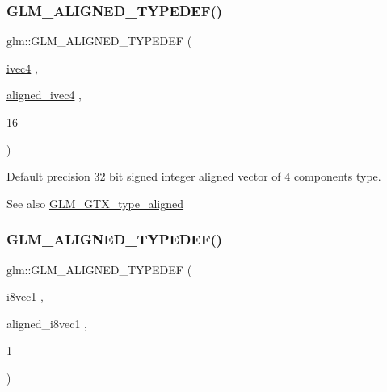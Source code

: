 \subsubsection{\texorpdfstring{G\+L\+M\+\_\+\+A\+L\+I\+G\+N\+E\+D\+\_\+\+T\+Y\+P\+E\+D\+E\+F()}{GLM\_ALIGNED\_TYPEDEF()}\hspace{0.1cm}{\footnotesize\ttfamily [52/209]}}
{\footnotesize\ttfamily glm\+::\+G\+L\+M\+\_\+\+A\+L\+I\+G\+N\+E\+D\+\_\+\+T\+Y\+P\+E\+D\+EF (\begin{DoxyParamCaption}\item[{\hyperlink{group__core__types_gaa4560ddc50320ea8f8a70d5c9c249fea}{ivec4}}]{,  }\item[{\hyperlink{group__gtc__type__aligned_gaa33169a30c7d22a8648f20b4534f635f}{aligned\+\_\+ivec4}}]{,  }\item[{16}]{ }\end{DoxyParamCaption})}

Default precision 32 bit signed integer aligned vector of 4 components type. \begin{DoxySeeAlso}{See also}
\hyperlink{group__gtx__type__aligned}{G\+L\+M\+\_\+\+G\+T\+X\+\_\+type\+\_\+aligned} 
\end{DoxySeeAlso}
\mbox{\label{group__gtx__type__aligned_ga9ec20fdfb729c702032da9378c79679f}} 
\subsubsection{\texorpdfstring{G\+L\+M\+\_\+\+A\+L\+I\+G\+N\+E\+D\+\_\+\+T\+Y\+P\+E\+D\+E\+F()}{GLM\_ALIGNED\_TYPEDEF()}\hspace{0.1cm}{\footnotesize\ttfamily [53/209]}}
{\footnotesize\ttfamily glm\+::\+G\+L\+M\+\_\+\+A\+L\+I\+G\+N\+E\+D\+\_\+\+T\+Y\+P\+E\+D\+EF (\begin{DoxyParamCaption}\item[{\hyperlink{group__gtc__type__precision_ga1cb1ef0f2a9266aba88f161c9062cebc}{i8vec1}}]{,  }\item[{aligned\+\_\+i8vec1}]{,  }\item[{1}]{ }\end{DoxyParamCaption})}

